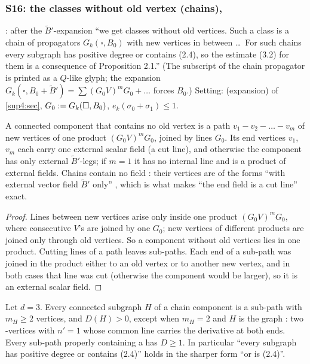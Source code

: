 
\subsubsection{S16: the classes without old vertex (chains), \cite[p.~433]{Ba3}}\label{sup4:ssec:S16}

\cite[p.~433]{Ba3}: after the $\tilde B'$-expansion ``we get classes without old vertices. Such a class is a chain of propagators $G_k(\square,B_0)$ with new vertices in between \dots\ For such chains every subgraph has positive degree or contains (2.4), so the estimate (3.2) for them is a consequence of Proposition 2.1.'' (The subscript of the chain propagator is printed as a $Q$-like glyph; the expansion $G_k(\square,B_0+\tilde B')=\sum(G_0V)^mG_0+\dots$ forces $B_0$.) Setting: (expansion) of \cref{sup4:sec}, $G_0:= G_k(\square,B_0)$, $e_k(\sigma_0+\sigma_1)\le1$.

\begin{lemma}\label{sup4:lem:S161}
A connected component that contains no old vertex is a path $v_1-v_2-\dots-v_m$ of new vertices of one product $(G_0V)^mG_0$, joined by lines $G_0$. Its end vertices $v_1$, $v_m$ each carry one external scalar field (a cut line), and otherwise the component has only external $\tilde B'$-legs; if $m=1$ it has no internal line and is a product of external fields. Chains contain no field \cite[(1.12)]{Ba3}: their vertices are of the forms \cite[(1.8)--(1.11), (1.13)--(1.15)]{Ba3} ``with external vector field $\tilde B'$ only'' \cite[p.~433]{Ba3}, which is what makes ``the end field is a cut line'' exact.
\end{lemma}

\begin{proof}
Lines between new vertices arise only inside one product $(G_0V)^mG_0$, where consecutive $V$'s are joined by one $G_0$; new vertices of different products are joined only through old vertices. So a component without old vertices lies in one product. Cutting lines of a path leaves sub-paths. Each end of a sub-path was joined in the product either to an old vertex or to another new vertex, and in both cases that line was cut (otherwise the component would be larger), so it is an external scalar field.
\end{proof}

\begin{lemma}\label{sup4:lem:S162}
Let $d=3$. Every connected subgraph $H$ of a chain component is a sub-path with $m_H\ge2$ vertices, and $D(H)>0$, except when $m_H=2$ and $H$ is the graph \cite[(2.4)]{Ba3}: two \cite[(1.8)]{Ba3}-vertices with $n'=1$ whose common line carries the derivative at both ends. Every sub-path properly containing a \cite[(2.4)]{Ba3} has $D\ge1$. In particular ``every subgraph has positive degree or contains (2.4)'' holds in the sharper form ``or is (2.4)''.
\end{lemma}

